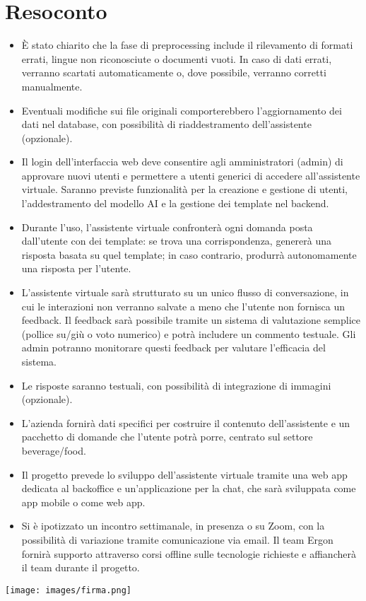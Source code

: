 \documentclass{TWReport}
\begin{document}
\section*{Resoconto}
\begin{itemize}
    \item È stato chiarito che la fase di preprocessing include il rilevamento di formati errati, lingue non riconosciute o documenti vuoti. In caso di dati errati, verranno scartati automaticamente o, dove possibile, verranno corretti manualmente.
    \item Eventuali modifiche sui file originali comporterebbero l’aggiornamento dei dati nel database, con possibilità di riaddestramento dell'assistente (opzionale).
    \item Il login dell'interfaccia web deve consentire agli amministratori (admin) di approvare nuovi utenti e permettere a utenti generici di accedere all’assistente virtuale. Saranno previste funzionalità per la creazione e gestione di utenti, l'addestramento del modello AI e la gestione dei template nel backend.
    \item Durante l’uso, l'assistente virtuale confronterà ogni domanda posta dall'utente con dei template: se trova una corrispondenza, genererà una risposta basata su quel template; in caso contrario, produrrà autonomamente una risposta per l’utente.
    \item L’assistente virtuale sarà strutturato su un unico flusso di conversazione, in cui le interazioni non verranno salvate a meno che l'utente non fornisca un feedback. Il feedback sarà possibile tramite un sistema di valutazione semplice (pollice su/giù o voto numerico) e potrà includere un commento testuale. Gli admin potranno monitorare questi feedback per valutare l’efficacia del sistema.
    \item Le risposte saranno testuali, con possibilità di integrazione di immagini (opzionale).
    \item L'azienda fornirà dati specifici per costruire il contenuto dell'assistente e un pacchetto di domande che l’utente potrà porre, centrato sul settore beverage/food.
    \item Il progetto prevede lo sviluppo dell’assistente virtuale tramite una web app dedicata al backoffice e un’applicazione per la chat, che sarà sviluppata come app mobile o come web app.
    \item Si è ipotizzato un incontro settimanale, in presenza o su Zoom, con la possibilità di variazione tramite comunicazione via email. Il team Ergon fornirà supporto attraverso corsi offline sulle tecnologie richieste e affiancherà il team durante il progetto.

\end{itemize}

\vspace*{\fill}\hspace*{\fill}
\texttt{[image: images/firma.png]}
\end{document}
